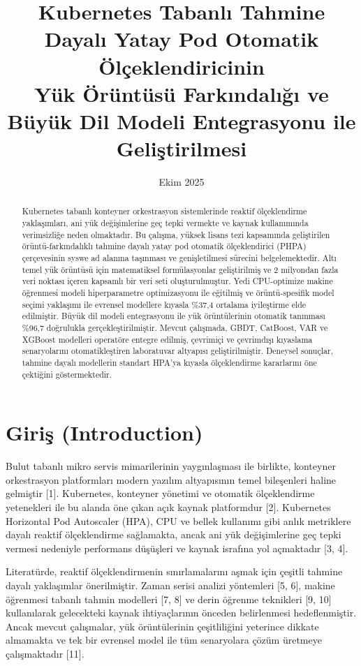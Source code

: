 \documentclass[12pt,a4paper]{article}
\title{Kubernetes Tabanlı Tahmine Dayalı Yatay Pod Otomatik Ölçeklendiricinin\\Yük Örüntüsü Farkındalığı ve Büyük Dil Modeli Entegrasyonu ile Geliştirilmesi}
\author{}
\date{Ekim 2025}
\begin{document}
\maketitle

\begin{abstract}
Kubernetes tabanlı konteyner orkestrasyon sistemlerinde reaktif ölçeklendirme yaklaşımları, ani yük değişimlerine geç tepki vermekte ve kaynak kullanımında verimsizliğe neden olmaktadır. Bu çalışma, yüksek lisans tezi kapsamında geliştirilen örüntü-farkındalıklı tahmine dayalı yatay pod otomatik ölçeklendirici (PHPA) çerçevesinin syswe ad alanına taşınması ve genişletilmesi sürecini belgelemektedir. Altı temel yük örüntüsü için matematiksel formülasyonlar geliştirilmiş ve 2 milyondan fazla veri noktası içeren kapsamlı bir veri seti oluşturulmuştur. Yedi CPU-optimize makine öğrenmesi modeli hiperparametre optimizasyonu ile eğitilmiş ve örüntü-spesifik model seçimi yaklaşımı ile evrensel modellere kıyasla \%37,4 ortalama iyileştirme elde edilmiştir. Büyük dil modeli entegrasyonu ile yük örüntülerinin otomatik tanınması \%96,7 doğrulukla gerçekleştirilmiştir. Mevcut çalışmada, GBDT, CatBoost, VAR ve XGBoost modelleri operatöre entegre edilmiş, çevrimiçi ve çevrimdışı kıyaslama senaryolarını otomatikleştiren laboratuvar altyapısı geliştirilmiştir. Deneysel sonuçlar, tahmine dayalı modellerin standart HPA'ya kıyasla ölçeklendirme kararlarını öne çektiğini göstermektedir.
\end{abstract}

\section{Giriş (Introduction)}

Bulut tabanlı mikro servis mimarilerinin yaygınlaşması ile birlikte, konteyner orkestrasyon platformları modern yazılım altyapısının temel bileşenleri haline gelmiştir [1]. Kubernetes, konteyner yönetimi ve otomatik ölçeklendirme yetenekleri ile bu alanda öne çıkan açık kaynak platformdur [2]. Kubernetes Horizontal Pod Autoscaler (HPA), CPU ve bellek kullanımı gibi anlık metriklere dayalı reaktif ölçeklendirme sağlamakta, ancak ani yük değişimlerine geç tepki vermesi nedeniyle performans düşüşleri ve kaynak israfına yol açmaktadır [3, 4].

Literatürde, reaktif ölçeklendirmenin sınırlamalarını aşmak için çeşitli tahmine dayalı yaklaşımlar önerilmiştir. Zaman serisi analizi yöntemleri [5, 6], makine öğrenmesi tabanlı tahmin modelleri [7, 8] ve derin öğrenme teknikleri [9, 10] kullanılarak gelecekteki kaynak ihtiyaçlarının önceden belirlenmesi hedeflenmiştir. Ancak mevcut çalışmalar, yük örüntülerinin çeşitliliğini yeterince dikkate almamakta ve tek bir evrensel model ile tüm senaryolara çözüm üretmeye çalışmaktadır [11].
\end{document}
